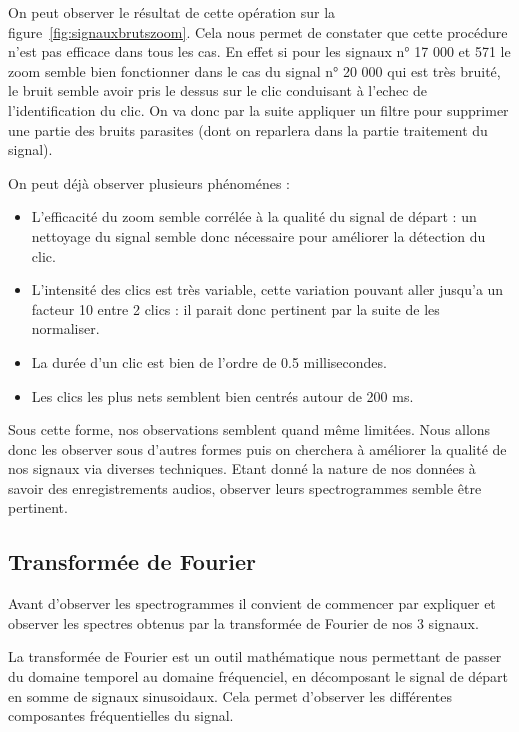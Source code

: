 On peut observer le résultat de cette opération sur la figure~\ref{fig:signauxbrutszoom}.
Cela nous permet de constater que cette procédure n'est pas efficace dans tous les cas. En effet si pour les signaux n° 17 000 et 571 le zoom semble bien fonctionner dans le cas du signal n° 20 000 qui est très bruité, le bruit semble avoir pris le dessus sur le clic conduisant à l'echec de l'identification du clic.
On va donc par la suite appliquer un filtre pour supprimer une partie des bruits parasites (dont on reparlera dans la partie traitement du signal).

On peut déjà observer plusieurs phénoménes :
\begin{itemize}
\item L'efficacité du zoom semble corrélée à la qualité du signal de départ : un nettoyage du signal semble donc nécessaire pour améliorer la détection du clic.
\item L'intensité des clics est très  variable, cette variation pouvant aller jusqu'a un facteur 10 entre 2 clics : il parait donc pertinent par la suite de les normaliser.
\item La durée d'un clic est bien de l'ordre de 0.5 millisecondes.
\item Les clics les plus nets semblent bien centrés autour de 200 ms.
\end{itemize}

Sous cette forme, nos observations semblent quand même limitées.
Nous allons donc les observer sous d'autres formes puis on cherchera à améliorer la qualité de nos signaux via diverses techniques. Etant donné la nature de nos données à savoir des enregistrements audios, observer leurs spectrogrammes semble être pertinent.

\hypertarget{Transformuxe9-de-Fourier}{%
\subsection{Transformée de Fourier}
\label{Transformuxe9-de-Fourier}}

Avant d'observer les spectrogrammes il convient de commencer par expliquer et observer les spectres obtenus par la transformée de Fourier de nos 3 signaux.

La transformée de Fourier est un outil mathématique nous permettant de passer du domaine temporel au domaine fréquenciel, en décomposant le signal de départ en somme de signaux sinusoidaux.
Cela permet d'observer les différentes composantes fréquentielles du signal.

